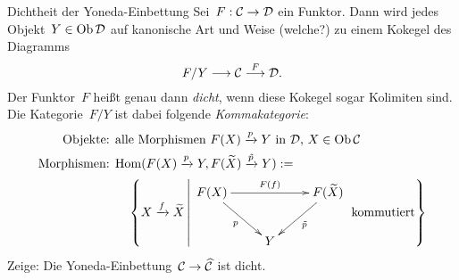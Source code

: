 \documentclass{pizzablatt}
\begin{document}
\begin{aufgabe}{Dichtheit der Yoneda-Einbettung}
Sei~$F:\mathcal{C}\to\mathcal{D}$ ein Funktor. Dann wird jedes Objekt~$Y \in \operatorname{Ob}\mathcal{D}$ auf
kanonische Art und Weise (welche?) zu einem Kokegel des Diagramms
\[ F/Y \longrightarrow \mathcal{C} \stackrel{F}{\longrightarrow} \mathcal{D}. \]
Der Funktor~$F$ heißt genau dann \emph{dicht}, wenn diese Kokegel sogar
Kolimiten sind. Die Kategorie~$F/Y$ ist dabei folgende \emph{Kommakategorie}:
\begin{align*}
  \text{Objekte: } & \text{alle Morphismen $F(X) \xra{p} Y$ in~$\D$, $X \in \Ob\C$} \\
  \text{Morphismen: } &
    \Hom(F(X) \xra{p} Y, F(\widetilde X) \xra{\tilde p} Y) := \\ &
      \quad\left\{ X \xra{f} \widetilde X \,\middle|\, \text{$
        \vcenter{\xymatrix{
          F(X) \ar[rr]^{F(f)} \ar[rd]_p && F(\widetilde X) \ar[dl]^{\tilde p} \\
          & Y
        }}$ kommutiert} \right\}
\end{align*}
Zeige: Die Yoneda-Einbettung~$\mathcal{C} \to \widehat{\mathcal{C}}$ ist dicht.
\end{aufgabe}
\end{document}
